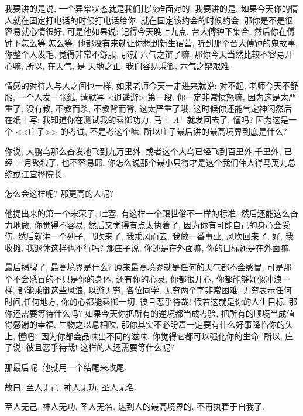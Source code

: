 \documentclass[11pt]{article}
\begin{document}
我要讲的是说, 一个异常状态就是我们比较难面对的, 我要讲的是, 如果今天你的情人就在固定打电话的时候打电话给你, 就在固定该约会的时候约会, 那你是不是很容易就心情很好, 可是他如果说: 记得今天晚上九点, 台大傅钟下集合. 然后你在傅钟下怎么等,怎么等, 他都没有来就让你想到新生宿营, 听到那个台大傅钟的鬼故事, 你整个人发毛, 觉得非常不舒服, 那就{\color{blue} 六气之辩}了嘛, 那你今天当然比较不容易开心嘛, 所以, 在天气, 是 {\color{blue} 天地之正}, 我们容易乘御, {\color{blue} 六气之辩}艰难.

情感的对待人与人之间也一样, 如果老师今天一走进来就说: 对不起, 老师今天不舒服, 一个人发一张纸, 请默写 <逍遥游> 第一段. 你一定非常愤怒嘛, 因为这是太严重了, 没有教, 不教而杀, 不教背而背, 这太严重了哦. 这时候你还能气定神闲然后在纸上写: 我知道你在测试我的乘御功力, 马上 $ A^{+} $ 就发回去了, 懂吗? 因为这是一个 <<庄子>> 的考试, 不是考这个嘛, 所以庄子最后讲的最高境界到底是什么? 

你说, 大鹏鸟那么奋发地飞到九万里外, 或者这个大鸟已经飞到百里外,千里外, 已经{\color{blue} 三月聚粮}了, 也不容易耶. 你怎么说那个最小只得才是这个我们伟大得马英九总统或江宜桦院长. 

怎么会这样呢? 那更高的人呢? 

他提出来的第一个宋荣子, 哇塞, 有这样一个跟世俗不一样的标准, 然后还能这么奋力地做, 你觉得不容易, 然后又觉得有点太执着了, 因为你有可能自己的身心会受伤. 然后就讲一个列子, 飞吹来了, 我乘风而去, 我做一番事业, 风吹回来了, 好, 我收摊, 我退休这样也不行吗? 那庄子说, 你还是在外面嘛, 你的目标还是在外面嘛.

最后揭牌了, 最高境界是什么? 原来最高境界就是任何的天气都不会感冒, 可是那个不会感冒的不只是你的身体, 还有你的心灵, 你都很开心, 你都能够好像冲浪一样, 都能乘御这些风浪, {\color{blue} 以游无穷}, 各位同学, 无穷两个字非常困难, 无穷表示任何时间,任何地方, 你的心都能乘御一切, {\color{blue} 彼且恶乎待哉!} 假若这就是你的人生目标, 那你还需要等待什么吗? 如果今天你把所有的逆境都当成考验, 把所有的顺境当成值得感谢的幸福, {\color{blue} 生物之以息相吹}, 那你其实不必盼着一定要有什么好事降临你的头上, 懂吧? 因为你都会品味出不同的滋味, 你觉得它都可以强化你的生命. 所以, 庄子说: {\color{blue} 彼且恶乎待哉!} 这样的人还需要等什么呢? 

那最后呢, 他就用一个结尾来收尾.

\begin{center}
	{\color{magenta} 故曰: 至人无己, 神人无功, 圣人无名.}
\end{center}

\vspace{-0.5cm}

{\color{blue} 至人无己, 神人无功, 圣人无名}, 达到人的最高境界的, 不再执着于自我了.
\end{document}
